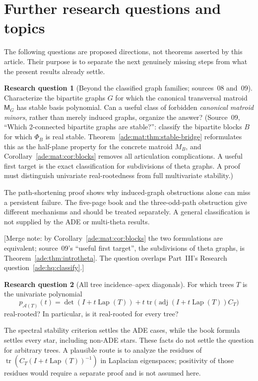 \documentclass[11pt]{article}
\numberwithin{equation}{section}
\theoremstyle{definition}
\newtheorem{question}{Research question}%
\newcommand{\adj}{\operatorname{adj}}
\newcommand{\tr}{\operatorname{tr}}
\newcommand{\Lap}{\operatorname{Lap}}
\newcommand{\calA}{\mathcal A}
\begin{document}
\section{Further research questions and topics}
\label{ade:sec:questions}

The following questions are proposed directions, not theorems asserted by
this article.  Their purpose is to separate the next genuinely missing
steps from what the present results already settle.

\begin{question}[Beyond the classified graph families; sources~08 and~09]\label{ade:q:first}
Characterize the bipartite graphs $G$ for which the canonical transversal
matroid $\mathsf M_G$ has stable basis polynomial.  Can a useful class of
forbidden \emph{canonical matroid minors}, rather than merely induced
graphs, organize the answer?
(Source~09, ``Which 2-connected bipartite graphs are stable?'': classify the bipartite blocks $B$ for which $\Phi_B$ is real stable.
Theorem~\ref{ade:mat:thm:stable-bridge} reformulates this as the half-plane property
for the concrete matroid $M_B$, and Corollary~\ref{ade:mat:cor:blocks} removes all
articulation complications. A useful first target is the exact
classification for subdivisions of theta graphs. A proof must distinguish
univariate real-rootedness from full multivariate stability.)
\end{question}
The path-shortening proof shows why induced-graph obstructions alone can
miss a persistent failure.  The five-page book and the three-odd-path
obstruction give different mechanisms and should be treated separately.
A general classification is not supplied by the ADE or multi-theta
results.

[Merge note: by Corollary~\ref{ade:mat:cor:blocks} the two formulations are
equivalent; source~09's ``useful first target'', the subdivisions of theta
graphs, is Theorem~\ref{ade:thm:introtheta}. The question overlaps Part~III's
Research question~\ref{ade:hq:classify}.]

\begin{question}[All tree incidence--apex diagonals]\label{mts:hq:diagonals}
For which trees $T$ is the univariate polynomial
\begin{equation}
 p_{\calA(T)}(t)
 =\det(I+t\Lap(T))
   +t\tr\bigl(\adj(I+t\Lap(T))C_T\bigr)
 \label{ade:eq:treeunivariatequestion}
\end{equation}
real-rooted?  In particular, is it real-rooted for every tree?
\end{question}
The spectral stability criterion settles the ADE cases, while the book
formula settles every star, including non-ADE stars.  These facts do not
settle the question for arbitrary trees.  A plausible route is to analyze
the residues of
$\tr(C_T(I+t\Lap(T))^{-1})$ in Laplacian eigenspaces; positivity of those
residues would require a separate proof and is not assumed here.
\end{document}
